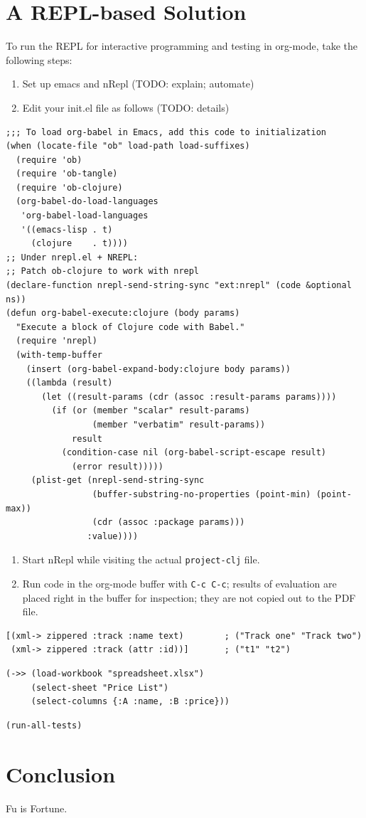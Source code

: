 \documentclass[11pt]{article}
\begin{document}
\section{A REPL-based Solution}
\label{sec-3}
\label{sec:emacs-repl}
To run the REPL for interactive programming and testing in org-mode,
take the following steps:
\begin{enumerate}
\item Set up emacs and nRepl (TODO: explain; automate)
\item Edit your init.el file as follows (TODO: details)
\end{enumerate}
\begin{verbatim}
;;; To load org-babel in Emacs, add this code to initialization
(when (locate-file "ob" load-path load-suffixes)
  (require 'ob)
  (require 'ob-tangle)
  (require 'ob-clojure)
  (org-babel-do-load-languages
   'org-babel-load-languages
   '((emacs-lisp . t)
     (clojure    . t))))
;; Under nrepl.el + NREPL:
;; Patch ob-clojure to work with nrepl
(declare-function nrepl-send-string-sync "ext:nrepl" (code &optional ns))
(defun org-babel-execute:clojure (body params)
  "Execute a block of Clojure code with Babel."
  (require 'nrepl)
  (with-temp-buffer
    (insert (org-babel-expand-body:clojure body params))
    ((lambda (result)
       (let ((result-params (cdr (assoc :result-params params))))
         (if (or (member "scalar" result-params)
                 (member "verbatim" result-params))
             result
           (condition-case nil (org-babel-script-escape result)
             (error result)))))
     (plist-get (nrepl-send-string-sync
                 (buffer-substring-no-properties (point-min) (point-max))
                 (cdr (assoc :package params)))
                :value))))
\end{verbatim}
\begin{enumerate}
\item Start nRepl while visiting the actual \verb|project-clj| file.
\item Run code in the org-mode buffer with \verb|C-c C-c|; results of
evaluation are placed right in the buffer for inspection; they are
not copied out to the PDF file.
\end{enumerate}

\begin{verbatim}
[(xml-> zippered :track :name text)        ; ("Track one" "Track two")
 (xml-> zippered :track (attr :id))]       ; ("t1" "t2")
\end{verbatim}

\begin{verbatim}
(->> (load-workbook "spreadsheet.xlsx")
     (select-sheet "Price List")
     (select-columns {:A :name, :B :price}))
\end{verbatim}

\begin{verbatim}
(run-all-tests)
\end{verbatim}
\section{Conclusion}
\label{sec-4}
Fu is Fortune.
\end{document}
